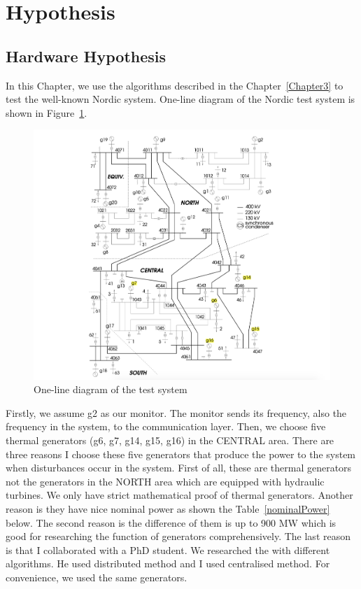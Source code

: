 \section{Hypothesis} %
\label{section4.1}
\subsection{Hardware Hypothesis} %
\label{subsection4.1.1}

In this Chapter, we use the algorithms described in the Chapter~\ref{Chapter3} to test the well-known Nordic system. One-line diagram of the Nordic test system is  shown in Figure~\ref{4_1_1_nordic}.\\

\begin{figure}[htbp]
\centering
\includegraphics[width = .891\textwidth]{figure/4_1_1_nordic.png}
\caption{One-line diagram of the test system}
\label{4_1_1_nordic}
\end{figure}

Firstly, we assume g2 as our monitor. The monitor sends its frequency, also the frequency in the system, to the communication layer. Then, we choose five thermal generators  (g6, g7, g14, g15, g16) in the CENTRAL area. There are three reasons I choose these five generators that produce the power to the system when disturbances occur in the system. First of all, these are thermal generators not the generators in the NORTH area which are equipped with hydraulic turbines. We only have strict mathematical proof of thermal generators. Another reason is they have nice nominal power as shown the Table~\ref{nominalPower} below. The second reason is the difference of them is up to 900 MW which is good for researching the function of generators comprehensively. The last reason is that I collaborated with a PhD student. We researched the  with different algorithms. He used distributed method and I used centralised method. For convenience, we used the same generators.\\



